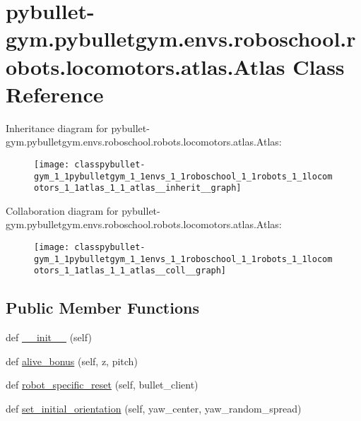 \hypertarget{classpybullet-gym_1_1pybulletgym_1_1envs_1_1roboschool_1_1robots_1_1locomotors_1_1atlas_1_1_atlas}{}\section{pybullet-\/gym.pybulletgym.\+envs.\+roboschool.\+robots.\+locomotors.\+atlas.\+Atlas Class Reference}
\label{classpybullet-gym_1_1pybulletgym_1_1envs_1_1roboschool_1_1robots_1_1locomotors_1_1atlas_1_1_atlas}


Inheritance diagram for pybullet-\/gym.pybulletgym.\+envs.\+roboschool.\+robots.\+locomotors.\+atlas.\+Atlas\+:
\nopagebreak
\begin{figure}[H]
\begin{center}
\leavevmode
\texttt{[image: classpybullet-gym\_1\_1pybulletgym\_1\_1envs\_1\_1roboschool\_1\_1robots\_1\_1locomotors\_1\_1atlas\_1\_1\_atlas\_\_inherit\_\_graph]}
\end{center}
\end{figure}


Collaboration diagram for pybullet-\/gym.pybulletgym.\+envs.\+roboschool.\+robots.\+locomotors.\+atlas.\+Atlas\+:
\nopagebreak
\begin{figure}[H]
\begin{center}
\leavevmode
\texttt{[image: classpybullet-gym\_1\_1pybulletgym\_1\_1envs\_1\_1roboschool\_1\_1robots\_1\_1locomotors\_1\_1atlas\_1\_1\_atlas\_\_coll\_\_graph]}
\end{center}
\end{figure}
\subsection*{Public Member Functions}
\begin{DoxyCompactItemize}
\item 
def \hyperlink{classpybullet-gym_1_1pybulletgym_1_1envs_1_1roboschool_1_1robots_1_1locomotors_1_1atlas_1_1_atlas_a0ba219f6d7820c4fabe9252ba019df68}{\+\_\+\+\_\+init\+\_\+\+\_\+} (self)
\item 
def \hyperlink{classpybullet-gym_1_1pybulletgym_1_1envs_1_1roboschool_1_1robots_1_1locomotors_1_1atlas_1_1_atlas_a603059cc3fded53c0aa17b7242e8bd14}{alive\+\_\+bonus} (self, z, pitch)
\item 
def \hyperlink{classpybullet-gym_1_1pybulletgym_1_1envs_1_1roboschool_1_1robots_1_1locomotors_1_1atlas_1_1_atlas_aa085fa16e62b23c9da8cc007cda9ad97}{robot\+\_\+specific\+\_\+reset} (self, bullet\+\_\+client)
\item 
def \hyperlink{classpybullet-gym_1_1pybulletgym_1_1envs_1_1roboschool_1_1robots_1_1locomotors_1_1atlas_1_1_atlas_a63f0fee02ea58a14e10b542f1ee9ed6e}{set\+\_\+initial\+\_\+orientation} (self, yaw\+\_\+center, yaw\+\_\+random\+\_\+spread)
\end{DoxyCompactItemize}
